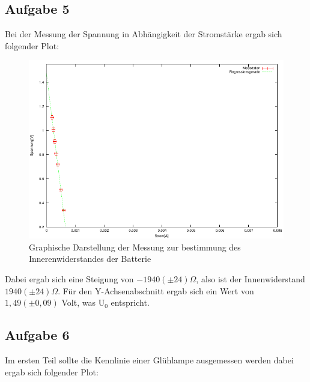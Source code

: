\documentclass[12pt]{scrartcl}
\begin{document}
\subsection{Aufgabe 5}
Bei der Messung der Spannung in Abhängigkeit der Stromstärke ergab sich folgender Plot:

\begin{figure}[htbp] 
	 \centering
	   \includegraphics[scale = 1]{Widerstand.pdf}
	 	\caption[Graphische Darstellung der Messung zur Bestimmung des Innerenwiderstandes der Batterie]{Graphische Darstellung der Messung zur bestimmung des Innerenwiderstandes der Batterie}
	 \label{fig:aufgabe_5_plot}
\end{figure}

Dabei ergab sich eine Steigung von $-1940 (\pm 24)\Omega$, also ist der Innenwiderstand $1940 (\pm 24)\Omega$.
Für den Y-Achsenabschnitt ergab sich ein Wert von $1,49	(\pm 0,09)$ Volt, was U$_0$ entspricht.

\newpage

\subsection{Aufgabe 6}
Im ersten Teil sollte die Kennlinie einer Glühlampe ausgemessen werden dabei ergab sich folgender Plot:
\end{document}
